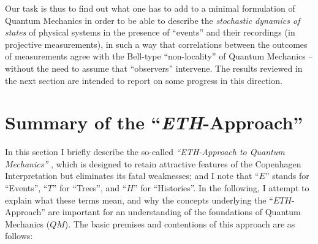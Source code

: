 \documentclass[a4paper,11pt]{article}
\begin{document}
Our task is thus to find out what one has to add to a minimal formulation of Quantum Mechanics in order to be able to describe the \textit{stochastic dynamics of states} of physical systems in the presence of ``events'' and their recordings (in projective measurements), in such a way that correlations between the outcomes of measurements agree with the Bell-type ``non-locality'' of Quantum Mechanics -- without the need to assume that ``observers'' intervene. The results reviewed in the next section are intended to report on some progress in this direction.

\section{Summary of the ``\textit{ETH}-Approach''}
In this section I briefly describe the so-called \textit{``ETH-Approach to Quantum Mechanics''} \cite{FS-Prob-Theory, BFS-forks, Schubnel-thesis, Les-Diablerets, FFS, FS-state-prep}, which is designed to retain attractive features of the Copenhagen Interpretation but eliminates its fatal weaknesses; and I note that ``$E$'' stands for ``Events'', ``$T$'' for ``Trees'', and ``$H$'' for ``Histories''. In the following, I attempt to explain what these terms mean, and why the concepts underlying the ``$ETH$-Approach'' are important for an understanding of the foundations of Quantum Mechanics ($QM$). The basic premises and contentions of this approach are as follows:
\end{document}
